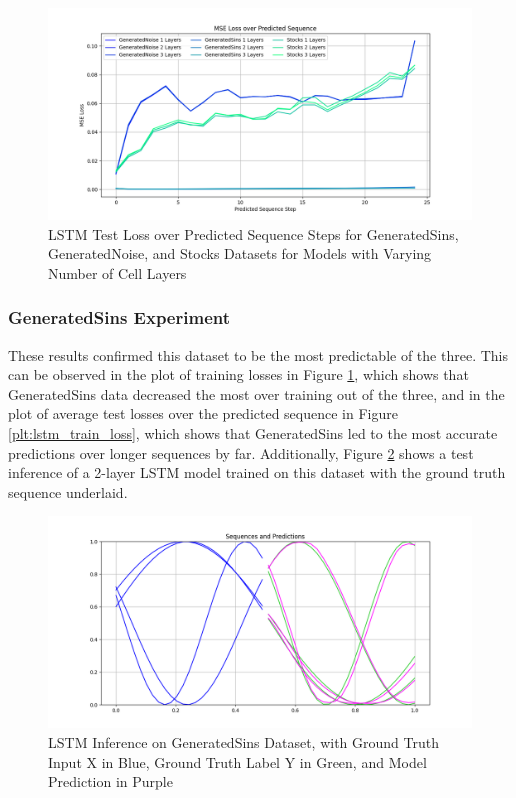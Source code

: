 \documentclass{scrartcl}
\begin{document}
\begin{figure}[H]
	\begin{center}
		\includegraphics[width=1\textwidth]{plots/lstm_seq_loss.png}
	\end{center}
	\caption{LSTM Test Loss over Predicted Sequence Steps for GeneratedSins, GeneratedNoise, and Stocks Datasets for Models 
	with Varying Number of Cell Layers}
	\label{plt:lstm_seq_loss}
\end{figure}

\subsubsection{GeneratedSins Experiment}
\label{subsubsec:generated_sins}

These results confirmed this dataset to be the most predictable of the three.
This can be observed in the plot of training losses in Figure
\ref{plt:lstm_seq_loss}, which shows that GeneratedSins data decreased the most
over training out of the three, and in the plot of average test losses over the
predicted sequence in Figure \ref{plt:lstm_train_loss}, which shows that
GeneratedSins led to the most accurate predictions over longer sequences by
far. Additionally, Figure \ref{plt:lstm_sins_inference} shows a test inference
of a 2-layer LSTM model trained on this dataset with the ground truth sequence
underlaid.  

\begin{figure}[H]
	\centering
	\includegraphics[width=1\textwidth]{plots/lstm_sins_inference.png}
	\caption{LSTM Inference on GeneratedSins Dataset, with Ground Truth Input X in Blue, Ground Truth Label Y in Green, and Model Prediction in Purple}
	\label{plt:lstm_sins_inference}
\end{figure}
\end{document}
